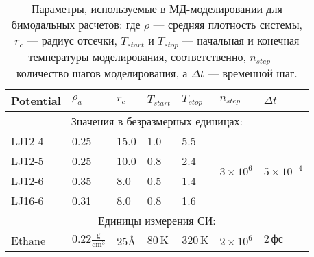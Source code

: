 \begin{table}[]
\centering
\begin{tabular}{|lllllcl|}
\hline
\multicolumn{1}{|l|}{Potential} & \multicolumn{1}{l|}{$\rho_a$} & \multicolumn{1}{l|}{$r_c$} & \multicolumn{1}{l|}{$T_{start}$} & \multicolumn{1}{l|}{$T_{stop}$} & \multicolumn{1}{l|}{$n_{step}$}                       & $\Delta t$                          \\ \hline
\multicolumn{7}{|c|}{Значения в безразмерных единицах:}                                                                                                                                                                                                         \\ \hline
\multicolumn{1}{|l|}{LJ12-4}    & \multicolumn{1}{l|}{0.25}     & \multicolumn{1}{l|}{15.0}  & \multicolumn{1}{l|}{1.0}         & \multicolumn{1}{l|}{5.5}        & \multicolumn{1}{c|}{\multirow{4}{*}{$3 \times 10^6$}} & \multirow{4}{*}{$5 \times 10^{-4}$} \\ \cline{1-5}
\multicolumn{1}{|l|}{LJ12-5}    & \multicolumn{1}{l|}{0.25}     & \multicolumn{1}{l|}{10.0}  & \multicolumn{1}{l|}{0.8}         & \multicolumn{1}{l|}{2.4}        & \multicolumn{1}{c|}{}                                 &                                     \\ \cline{1-5}
\multicolumn{1}{|l|}{LJ12-6}    & \multicolumn{1}{l|}{0.35}     & \multicolumn{1}{l|}{8.0}   & \multicolumn{1}{l|}{0.5}         & \multicolumn{1}{l|}{1.4}        & \multicolumn{1}{c|}{}                                 &                                     \\ \cline{1-5}
\multicolumn{1}{|l|}{LJ16-6}    & \multicolumn{1}{l|}{0.31}     & \multicolumn{1}{l|}{8.0}   & \multicolumn{1}{l|}{0.8}         & \multicolumn{1}{l|}{1.6}        & \multicolumn{1}{c|}{}                                 &                                     \\ \hline
\multicolumn{7}{|c|}{Единицы измерения СИ:}                                                                                                                                                                                                                     \\ \hline
\multicolumn{1}{|l|}{Ethane}    & \multicolumn{1}{l|}{$0.22\mathrm{\frac{g}{cm^3}}$}     & \multicolumn{1}{l|}{$25\text{\AA}$}    & \multicolumn{1}{l|}{$80\,\mathrm{K}$}          & \multicolumn{1}{l|}{$320\,\mathrm{K}$}        & \multicolumn{1}{l|}{$2 \times 10^6$}                  & $2\,\mathrm{\text{фс}}$                                   \\ \hline
\end{tabular}
\caption{Параметры, используемые в МД-моделировании для бимодальных расчетов: где $\rho$ — средняя плотность системы, $r_c$ — радиус отсечки, $T_{start}$ и $T_{stop}$ — начальная и конечная температуры моделирования, соответственно, $n_{step}$ — количество шагов моделирования, а $\Delta t$ — временной шаг.}
\label{MACR-Table1}
\end{table}



